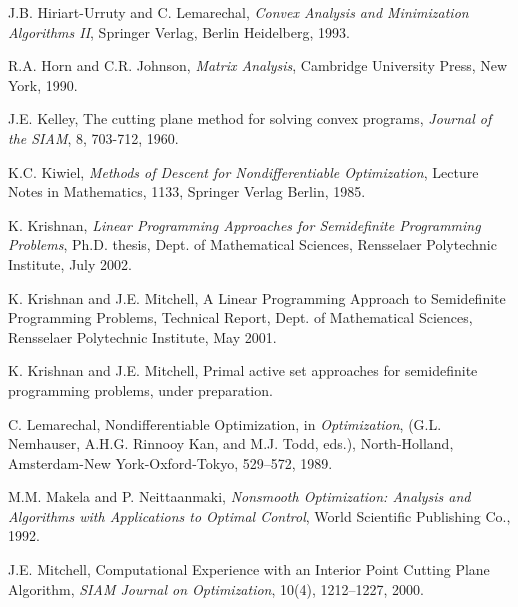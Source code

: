 \documentclass[12pt]{kluwer}
\begin{document}
\begin{article}
\begin{thebibliography}{55}
J.B. Hiriart-Urruty and C. Lemarechal,
{\em Convex Analysis and Minimization Algorithms II}, Springer Verlag, Berlin
Heidelberg, 1993.

R.A. Horn and C.R. Johnson,
{\em Matrix Analysis}, Cambridge University Press, New York, 1990.

 J.E. Kelley,
The cutting plane method for solving convex programs,
{\em Journal of the SIAM}, 8, 703-712, 1960.

 K.C. Kiwiel,
{\em Methods of Descent for Nondifferentiable Optimization},
Lecture Notes in Mathematics, 1133, Springer Verlag Berlin, 1985.

 K. Krishnan,
{\em Linear Programming Approaches for Semidefinite Programming Problems},
Ph.D. thesis, Dept. of Mathematical Sciences, Rensselaer Polytechnic Institute, July 2002.

K. Krishnan and J.E. Mitchell,
A Linear Programming Approach to Semidefinite Programming Problems,
Technical Report, Dept. of Mathematical Sciences, Rensselaer Polytechnic
Institute, May 2001.

K. Krishnan and J.E. Mitchell, Primal active set
approaches for semidefinite programming problems, under preparation.

 C. Lemarechal,
Nondifferentiable Optimization, in
{\em Optimization},
(G.L. Nemhauser, A.H.G. Rinnooy Kan, and M.J. Todd, eds.),
North-Holland, Amsterdam-New York-Oxford-Tokyo, 529--572, 1989.

M.M. Makela and P. Neittaanmaki,
{\em Nonsmooth Optimization:
Analysis and Algorithms with Applications to Optimal Control}, World Scientific Publishing Co.,
1992.

 J.E. Mitchell,
Computational Experience with an Interior Point Cutting Plane Algorithm,
{\em SIAM Journal on Optimization}, 10(4), 1212--1227, 2000.


\end{thebibliography}
\end{article}
\end{document}

